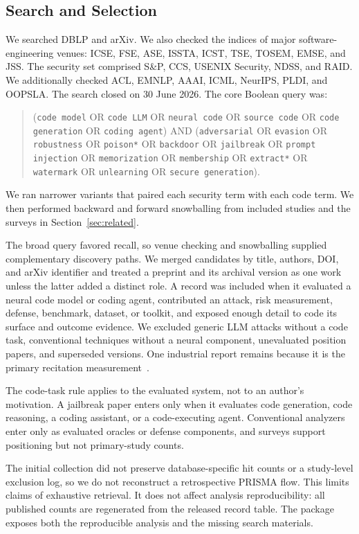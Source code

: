 \documentclass[acmsmall,screen,review]{acmart}
\begin{document}
\subsection{Search and Selection}
We searched DBLP and arXiv. We also checked the indices of major software-engineering venues: ICSE, FSE, ASE, ISSTA, ICST, TSE, TOSEM, EMSE, and JSS. The security set comprised S\&P, CCS, USENIX Security, NDSS, and RAID. We additionally checked ACL, EMNLP, AAAI, ICML, NeurIPS, PLDI, and OOPSLA. The search closed on 30 June 2026. The core Boolean query was:
\begin{quote}\small\RaggedRight
(\texttt{code model} OR \texttt{code LLM} OR \texttt{neural code} OR
\texttt{source code} OR \texttt{code generation} OR \texttt{coding agent}) AND
(\texttt{adversarial} OR \texttt{evasion} OR \texttt{robustness} OR
\texttt{poison*} OR \texttt{backdoor} OR \texttt{jailbreak} OR
\texttt{prompt injection} OR \texttt{memorization} OR \texttt{membership} OR
\texttt{extract*} OR \texttt{watermark} OR \texttt{unlearning} OR
\texttt{secure generation}).
\end{quote}
We ran narrower variants that paired each security term with each code term. We then performed backward and forward snowballing from included studies and the surveys in Section~\ref{sec:related}.

The broad query favored recall, so venue checking and snowballing supplied complementary discovery paths. We merged candidates by title, authors, DOI, and arXiv identifier and treated a preprint and its archival version as one work unless the latter added a distinct role. A record was included when it evaluated a neural code model or coding agent, contributed an attack, risk measurement, defense, benchmark, dataset, or toolkit, and exposed enough detail to code its surface and outcome evidence. We excluded generic LLM attacks without a code task, conventional techniques without a neural component, unevaluated position papers, and superseded versions. One industrial report remains because it is the primary recitation measurement~\cite{ziegler2021recitation}.

The code-task rule applies to the evaluated system, not to an author's motivation. A jailbreak paper enters only when it evaluates code generation, code reasoning, a coding assistant, or a code-executing agent. Conventional analyzers enter only as evaluated oracles or defense components, and surveys support positioning but not primary-study counts.

The initial collection did not preserve database-specific hit counts or a study-level exclusion log, so we do not reconstruct a retrospective PRISMA flow. This limits claims of exhaustive retrieval. It does not affect analysis reproducibility: all published counts are regenerated from the released record table. The package exposes both the reproducible analysis and the missing search materials.
\end{document}
